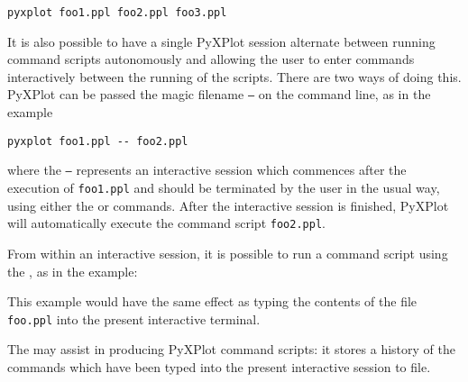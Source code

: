 \begin{verbatim}
pyxplot foo1.ppl foo2.ppl foo3.ppl
\end{verbatim}

It is also possible to have a single PyXPlot session alternate between running
command scripts autonomously and allowing the user to enter commands
interactively between the running of the scripts. There are two ways of doing
this.  PyXPlot can be passed the magic filename {\tt --} on the command line,
as in the example

\begin{verbatim}
pyxplot foo1.ppl -- foo2.ppl
\end{verbatim}

\noindent where the {\tt --} represents an interactive session which commences
after the execution of {\tt foo1.ppl} and should be terminated by the user in
the usual way, using either the  or  commands.
After the interactive session is finished, PyXPlot will automatically execute
the command script {\tt foo2.ppl}.

From within an interactive session, it is possible to run a command script
using the , as in the example:

\vspace{3mm}
\vspace{3mm}

\noindent This example would have the same effect as typing the contents of the
file {\tt foo.ppl} into the present interactive terminal.

The  may assist in producing PyXPlot command scripts: it stores a
history of the commands which have been typed into the present interactive
session to file.


